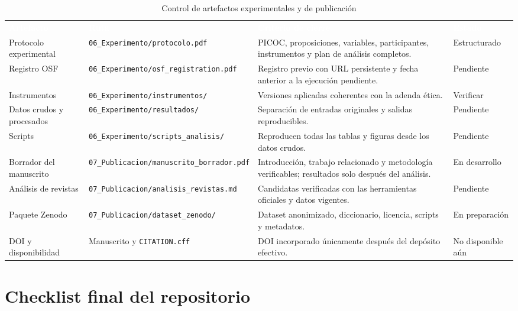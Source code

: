 \documentclass[12pt,a4paper]{article}
\begin{document}
\begin{table}[H]
\centering
\caption{Control de artefactos experimentales y de publicación}
\label{tab:control-experimental-anexo}
\small
{}
\begin{tabularx}{\textwidth}{L{3.50cm} L{3.40cm} Y L{2.40cm}}
\textcolor{white}{\textbf{Artefacto}} &
\textcolor{white}{\textbf{Ruta}} &
\textcolor{white}{\textbf{Criterio de cierre}} &
\textcolor{white}{\textbf{Estado}}\\
Protocolo experimental & \nolinkurl{06_Experimento/protocolo.pdf} & PICOC, proposiciones, variables, participantes, instrumentos y plan de análisis completos. & Estructurado\\
Registro OSF & \nolinkurl{06_Experimento/osf_registration.pdf} & Registro previo con URL persistente y fecha anterior a la ejecución pendiente. & Pendiente\\
Instrumentos & \nolinkurl{06_Experimento/instrumentos/} & Versiones aplicadas coherentes con la adenda ética. & Verificar\\
Datos crudos y procesados & \nolinkurl{06_Experimento/resultados/} & Separación de entradas originales y salidas reproducibles. & Pendiente\\
Scripts & \nolinkurl{06_Experimento/scripts_analisis/} & Reproducen todas las tablas y figuras desde los datos crudos. & Pendiente\\
Borrador del manuscrito & \nolinkurl{07_Publicacion/manuscrito_borrador.pdf} & Introducción, trabajo relacionado y metodología verificables; resultados solo después del análisis. & En desarrollo\\
Análisis de revistas & \nolinkurl{07_Publicacion/analisis_revistas.md} & Candidatas verificadas con las herramientas oficiales y datos vigentes. & Pendiente\\
Paquete Zenodo & \nolinkurl{07_Publicacion/dataset_zenodo/} & Dataset anonimizado, diccionario, licencia, scripts y metadatos. & En preparación\\
DOI y disponibilidad & Manuscrito y \nolinkurl{CITATION.cff} & DOI incorporado únicamente después del depósito efectivo. & No disponible aún\\
\end{tabularx}
\end{table}

\section{Checklist final del repositorio}
\label{ap:checklist-repositorio}
\end{document}
